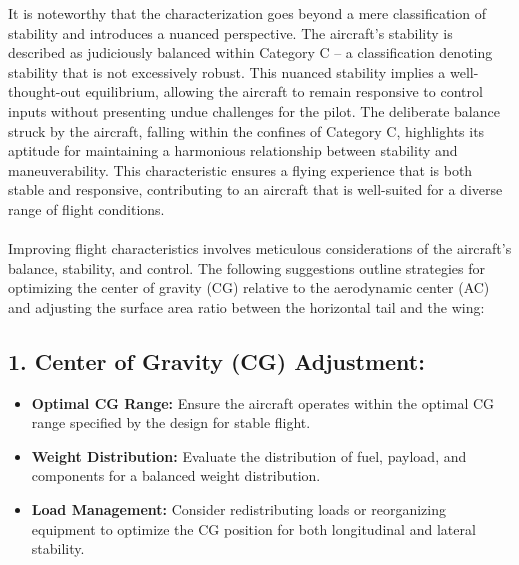 \documentclass[a4paper, twoside]{article}
\begin{document}
It is noteworthy that the characterization goes beyond a mere classification of stability and introduces a nuanced perspective. The aircraft's stability is described as judiciously balanced within Category C – a classification denoting stability that is not excessively robust. This nuanced stability implies a well-thought-out equilibrium, allowing the aircraft to remain responsive to control inputs without presenting undue challenges for the pilot. The deliberate balance struck by the aircraft, falling within the confines of Category C, highlights its aptitude for maintaining a harmonious relationship between stability and maneuverability. This characteristic ensures a flying experience that is both stable and responsive, contributing to an aircraft that is well-suited for a diverse range of flight conditions.\\
\\  
Improving flight characteristics involves meticulous considerations of the aircraft's balance, stability, and control. The following suggestions outline strategies for optimizing the center of gravity (CG) relative to the aerodynamic center (AC) and adjusting the surface area ratio between the horizontal tail and the wing:

\subsection*{1. Center of Gravity (CG) Adjustment:}
\begin{itemize}
    \item \textbf{Optimal CG Range:} Ensure the aircraft operates within the optimal CG range specified by the design for stable flight.
    \item \textbf{Weight Distribution:} Evaluate the distribution of fuel, payload, and components for a balanced weight distribution.
    \item \textbf{Load Management:} Consider redistributing loads or reorganizing equipment to optimize the CG position for both longitudinal and lateral stability.
\end{itemize}
\end{document}
